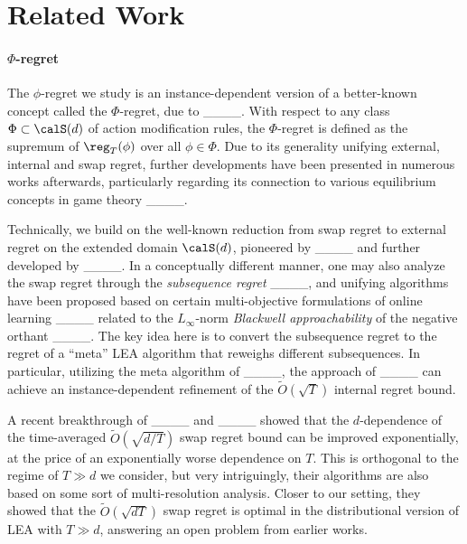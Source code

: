 \section{Related Work}
\paragraph{$\Phi$-regret} The $\phi$-regret we study is an instance-dependent version of a better-known concept called the $\Phi$-regret, due to ____. With respect to any class $\Phi\subset\calS(d)$ of action modification rules, the $\Phi$-regret is defined as the supremum of $\reg_T(\phi)$ over all $\phi\in\Phi$. Due to its generality unifying external, internal and swap regret, further developments have been presented in numerous works afterwards, particularly regarding its connection to various equilibrium concepts in game theory ____. 

Technically, we build on the well-known reduction from swap regret to external regret on the extended domain $\calS(d)$, pioneered by ____ and further developed by ____. In a conceptually different manner, one may also analyze the swap regret through the \emph{subsequence regret} ____, and unifying algorithms have been proposed based on certain multi-objective formulations of online learning ____ related to the $L_\infty$-norm \emph{Blackwell approachability} of the negative orthant ____. The key idea here is to convert the subsequence regret to the regret of a ``meta'' LEA algorithm that reweighs different subsequences. In particular, utilizing the meta algorithm of ____, the approach of ____ can achieve an instance-dependent refinement of the $\tilde O(\sqrt{T})$ internal regret bound.

A recent breakthrough of ____ and ____ showed that the $d$-dependence of the time-averaged $\tilde O(\sqrt{d/T})$ swap regret bound can be improved exponentially, at the price of an exponentially worse dependence on $T$. This is orthogonal to the regime of $T\gg d$ we consider, but very intriguingly, their algorithms are also based on some sort of multi-resolution analysis. Closer to our setting, they showed that the $\tilde O(\sqrt{dT})$ swap regret is optimal in the distributional version of LEA with $T\gg d$, answering an open problem from earlier works. 

